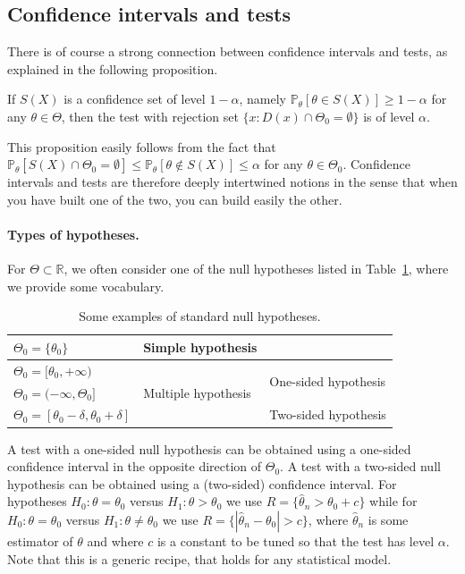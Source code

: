 \documentclass[
	fontsize=11pt, %
	twoside=false, %
	numbers=noenddot, %
]{kaobook}
\renewcommand{\P}{\mathbb P}
\newcommand{\R}{\mathbb R}
\newcommand{\wh}{\widehat}
\begin{document}
\subsection{Confidence intervals and tests} %


There is of course a strong connection between confidence intervals and tests, as explained in the following proposition.
\begin{proposition}
	\label{prop:ci-and-tests}
	If $S(X)$ is a confidence set of level $1 - \alpha$, namely $\P_\theta[ \theta \in S(X)] \geq 1 - \alpha$ for any $\theta \in \Theta$, then the test with rejection set $\{ x : D(x) \cap \Theta_0  = \emptyset\}$ is of level $\alpha$.
\end{proposition}
This proposition easily follows from the fact that $\P_\theta[ S(X) \cap \Theta_0 = \emptyset] \leq \P_\theta[ \theta \notin S(X) ] \leq \alpha$ for any $\theta \in \Theta_0$.
Confidence intervals and tests are therefore deeply intertwined notions in the sense that when you have built one of the two, you can build easily the other.

\paragraph{Types of hypotheses.} %

For $\Theta \subset \R$, we often consider one of the null hypotheses listed in Table~\ref{tab:standard-null-hypothesis}, where we provide some vocabulary.
\begin{table}[htbp]
	\centering
	\small
	\begin{tabular}{|l|l|l|}\hline
		$\Theta_0 = \{ \theta_0 \}$ & Simple hypothesis & \\ \hline
		$\Theta_0 = [\theta_0, +\infty)$ & \multirow{3}{*}{Multiple hypothesis} & \multirow{2}{*}{One-sided hypothesis} \\
		$\Theta_0 = (-\infty, \Theta_0]$ & & \\  \cline{3-3}
		$\Theta_0 = [\theta_0 - \delta, \theta_0 + \delta]$ & & Two-sided hypothesis \\ \hline
	\end{tabular}
	\caption{Some examples of standard null hypotheses.}
	\label{tab:standard-null-hypothesis}
\end{table}

A test with a one-sided null hypothesis can be obtained using a one-sided confidence interval in the opposite direction of $\Theta_0$. A test with a two-sided null hypothesis can be obtained using a (two-sided) confidence interval.
For hypotheses $H_0 : \theta = \theta_0$ versus $H_1 : \theta > \theta_0$ we use $R = \{ \wh \theta_n > \theta_0 + c \}$ while for $H_0 : \theta = \theta_0$ versus $H_1 : \theta \neq \theta_0$ we use $R = \{ | \wh \theta_n - \theta_0 | > c \}$, where $\wh \theta_n$ is some estimator of $\theta$ and where $c$ is a constant to be tuned so that the test has level $\alpha$.
Note that this is a generic recipe, that holds for any statistical model.
\end{document}
